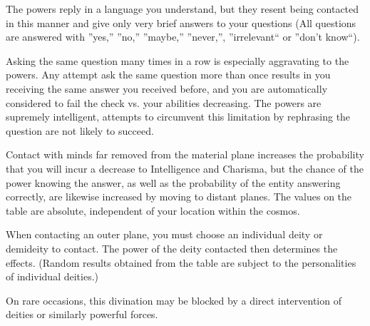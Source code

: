 The powers reply in a language you understand, but they resent being contacted in this manner and give only very brief answers to your questions
(All questions are answered with ''yes,'' ''no,'' ''maybe,'' ''never,'', ''irrelevant`` or ''don't know``).

Asking the same question many times in a row is especially aggravating to the powers.
Any attempt ask the same question more than once results in you receiving the same answer you received before,
and you are automatically considered to fail the check vs. your abilities decreasing.
The powers are supremely intelligent, attempts to circumvent this limitation by rephrasing the question are not likely to succeed. 

Contact with minds far removed from the material plane increases the probability that you will incur a decrease to Intelligence and Charisma, 
but the chance of the power knowing the answer, as well as the probability of the entity answering correctly,  are likewise increased by moving to distant planes. The values on the table are absolute, independent of your location within the cosmos.

When contacting an outer plane, you must choose an individual deity or demideity to contact.
The power of the deity contacted then determines the effects.
(Random results obtained from the table are subject to the personalities of individual deities.)

On rare occasions, this divination may be blocked by a direct intervention of deities or similarly powerful forces.

